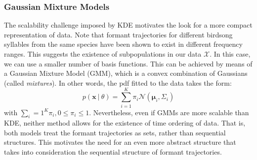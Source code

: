 \documentclass[pdftex,11pt,a4paper]{article}
\theoremstyle{definition}
\theoremstyle{remark}
\newcommand*{\V}[1]{\mathbf{#1}}%
\newcommand\given[1][]{\:#1\vert\:}
\begin{document}
\subsubsection{Gaussian Mixture Models}
\label{subsection_gmm}
The scalability challenge imposed by KDE motivates the look for a more compact representation of data. Note that formant trajectories for different birdsong syllables from the same species have been shown to exist in different frequency ranges. This suggests the existence of subpopulations in our data $\mathcal{X}$. In this case, we can use a smaller number of basis functions. This can be achieved by means of a Gaussian Mixture Model (GMM), which is a convex combination of Gaussians (called \emph{mixtures}). In other words, the pdf fitted to the data takes the form:
\begin{equation} \label{eq:mixmod}
p(\V{x} \given \theta ) = \sum_{i=1}^K\pi_i \mathcal{N}(\V{\mu}_i, \Sigma_i) 
\end{equation}
with $\sum_i=1^K\pi_i, 0 \leq \pi_i\leq 1$. Nevertheless, even if GMMs are more scalable than KDE, neither method allows for the existence of time ordering of data. That is, both models treat the formant trajectories as sets, rather than sequential structures. This motivates the need for an even more abstract structure that takes into consideration the sequential structure of formant trajectories.
\end{document}
